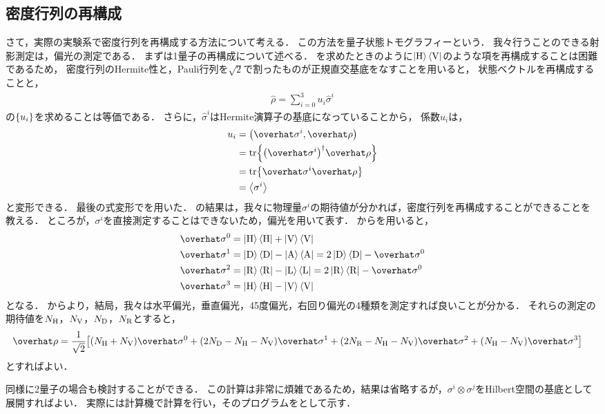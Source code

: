 \documentclass{report}
\begin{document}
  \subsection{密度行列の再構成}
    さて，実際の実験系で密度行列を再構成する方法について考える．
    この方法を量子状態トモグラフィーという．
    我々行うことのできる射影測定は，偏光の測定である．
    まずは1量子の再構成について述べる．
    を求めたときのように$\ket{\mathrm{H}}\bra{\mathrm{V}}$のような項を再構成することは困難であるため，
    密度行列のHermite性と，Pauli行列を$\sqrt{2}$で割ったものが正規直交基底をなすことを用いると，
    状態ベクトルを再構成することと，
    \begin{align}
      \hat{\rho} = \sum_{i = 0}^{3}u_i\hat{\sigma}^i
    \end{align}
    の$\qty{u_i}$を求めることは等価である．
    さらに，$\hat{\sigma}^i$はHermite演算子の基底になっていることから，
    係数$u_i$は，
    \begin{align}
      u_i &= \qty(\hat{\sigma}^i, \hat{\rho}) \\ 
      &= \tr{\qty(\hat{\sigma}^i)^{\dag}\hat{\rho}} \\ 
      &= \tr{\hat{\sigma}^i\hat{\rho}} \\ 
      &= \ev{\sigma^i} \label{1-bit-qst-u}
    \end{align}
    と変形できる．
    最後の式変形でを用いた．
    の結果は，我々に物理量$\sigma^i$の期待値が分かれば，密度行列を再構成することができることを教える．
    ところが，$\sigma^i$を直接測定することはできないため，偏光を用いて表す．
    からを用いると，
    \begin{align}
      \hat{\sigma}^0 &= \ketH\braH + \ketV\braV \label{sigma-0-uses-polarization} \\ 
      \hat{\sigma}^1 &= \ketD\braD - \ketA\braA = 2\ketD\braD - \hat{\sigma}^0 \label{sigma-1-uses-polarization} \\ 
      \hat{\sigma}^2 &= \ketR\braR - \ketL\braL = 2\ketR\braR - \hat{\sigma}^0 \label{sigma-2-uses-polarization} \\ 
      \hat{\sigma}^3 &= \ketH\braH - \ketV\braV\label{sigma-3-uses-polarization}
    \end{align}
    となる．
    からより，結局，我々は水平偏光，垂直偏光，45度偏光，右回り偏光の4種類を測定すれば良いことが分かる．
    それらの測定の期待値を$N_{\mathrm{H}}$，$N_{\mathrm{V}}$，$N_{\mathrm{D}}$，$N_{\mathrm{R}}$とすると，
    \begin{align}
      \hat{\rho} &= \frac{1}{\sqrt{2}}\qty[(N_{\r{H}} + N_{\r{V}})\hat{\sigma}^0 + (2N_{\r{D}} - N_{\r{H}} - N_{\r{V}})\hat{\sigma}^1 + (2N_{\r{R}} - N_{\r{H}} - N_{\r{V}})\hat{\sigma}^2 + (N_{\r{H}} - N_{\r{V}})\hat{\sigma}^3]
    \end{align}
    とすればよい．
    \par
    同様に2量子の場合も検討することができる．
    この計算は非常に煩雑であるため，結果は省略するが，$\sigma^i\otimes\sigma^j$をHilbert空間の基底として展開すればよい．
    実際には計算機で計算を行い，そのプログラムをとして示す．
\end{document}
